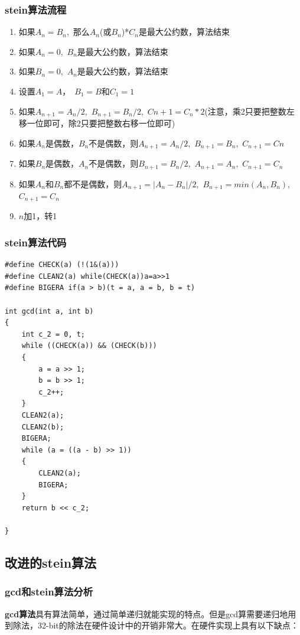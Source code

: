 \documentclass[12pt]{article}
\begin{document}
\subsubsection{stein算法流程}
\begin{enumerate}
\item 如果$A_{n} = B_{n}$,~那么$A_{n}$(或$B_{n}$)*$C_{n}$是最大公约数，算法结束
\item 如果$A_{n} = 0$,~$B_{n}$是最大公约数，算法结束
\item 如果$B_{n} = 0$,~$A_{n}$是最大公约数，算法结束
\item 设置$A_{1} = A$，~$B_{1} = B$和$C_{1} = 1$
\item 如果$A_{n+1} = A_{n}/2$,~$B_{n+1} = B_{n}/2$,~$C{n+1} = C_{n}*2$(注意，乘2只要把整数左移一位即可，除2只要把整数右移一位即可)
\item 如果$A_{n}$是偶数，$B_{n}$不是偶数，则$A_{n+1} = A_{n}/2$,~$B_{n+1} = B_{n}$,~$C_{n+1} = C{n}$
\item 如果$B_{n}$是偶数，$A_{n}$不是偶数，则$B_{n+1} = B_{n}/2$,~$A_{n+1} = A_{n}$,~$C_{n+1} = C_{n}$
\item 如果$A_{n}$和$B_{n}$都不是偶数，则$A_{n+1} = |A_{n} - B_{n}|/2$,~$B_{n+1} = min(A_{n},B_{n})$,~$C_{n+1} = C_{n}$
\item $n$加1，转1
\end{enumerate}
\subsubsection{stein算法代码}
\lstset{language=C}
\begin{lstlisting}
#define CHECK(a) (!(1&(a)))
#define CLEAN2(a) while(CHECK(a))a=a>>1
#define BIGERA if(a > b)(t = a, a = b, b = t)

int gcd(int a, int b)
{
	int c_2 = 0, t;
	while ((CHECK(a)) && (CHECK(b)))
	{
		a = a >> 1;
		b = b >> 1;
		c_2++;
	}
	CLEAN2(a);
	CLEAN2(b);
	BIGERA;
	while (a = ((a - b) >> 1))
	{
		CLEAN2(a);
		BIGERA;
	}
	return b << c_2;

}
\end{lstlisting}

\subsection{改进的stein算法}

\subsubsection{gcd和stein算法分析}
\textbf{gcd算法}具有算法简单，通过简单递归就能实现的特点。但是gcd算需要递归地用到除法，32-bit的除法在硬件设计中的开销非常大。在硬件实现上具有以下缺点：
\end{document}
